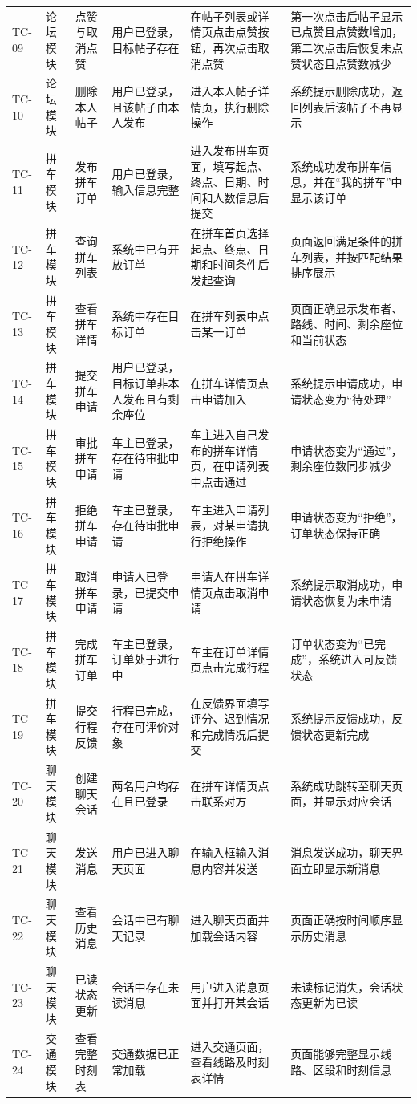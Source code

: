 \begin{longtable}{p{1.4cm}p{1.6cm}p{1.8cm}p{2.3cm}p{3.4cm}p{3.4cm}}
  TC-09 & 论坛模块 & 点赞与取消点赞 & 用户已登录，目标帖子存在 & 在帖子列表或详情页点击点赞按钮，再次点击取消点赞 & 第一次点击后帖子显示已点赞且点赞数增加，第二次点击后恢复未点赞状态且点赞数减少 \\
  TC-10 & 论坛模块 & 删除本人帖子 & 用户已登录，且该帖子由本人发布 & 进入本人帖子详情页，执行删除操作 & 系统提示删除成功，返回列表后该帖子不再显示 \\
  TC-11 & 拼车模块 & 发布拼车订单 & 用户已登录，输入信息完整 & 进入发布拼车页面，填写起点、终点、日期、时间和人数信息后提交 & 系统成功发布拼车信息，并在“我的拼车”中显示该订单 \\
  TC-12 & 拼车模块 & 查询拼车列表 & 系统中已有开放订单 & 在拼车首页选择起点、终点、日期和时间条件后发起查询 & 页面返回满足条件的拼车列表，并按匹配结果排序展示 \\
  TC-13 & 拼车模块 & 查看拼车详情 & 系统中存在目标订单 & 在拼车列表中点击某一订单 & 页面正确显示发布者、路线、时间、剩余座位和当前状态 \\
  TC-14 & 拼车模块 & 提交拼车申请 & 用户已登录，目标订单非本人发布且有剩余座位 & 在拼车详情页点击申请加入 & 系统提示申请成功，申请状态变为“待处理” \\
  TC-15 & 拼车模块 & 审批拼车申请 & 车主已登录，存在待审批申请 & 车主进入自己发布的拼车详情页，在申请列表中点击通过 & 申请状态变为“通过”，剩余座位数同步减少 \\
  TC-16 & 拼车模块 & 拒绝拼车申请 & 车主已登录，存在待审批申请 & 车主进入申请列表，对某申请执行拒绝操作 & 申请状态变为“拒绝”，订单状态保持正确 \\
  TC-17 & 拼车模块 & 取消拼车申请 & 申请人已登录，已提交申请 & 申请人在拼车详情页点击取消申请 & 系统提示取消成功，申请状态恢复为未申请 \\
  TC-18 & 拼车模块 & 完成拼车订单 & 车主已登录，订单处于进行中 & 车主在订单详情页点击完成行程 & 订单状态变为“已完成”，系统进入可反馈状态 \\
  TC-19 & 拼车模块 & 提交行程反馈 & 行程已完成，存在可评价对象 & 在反馈界面填写评分、迟到情况和完成情况后提交 & 系统提示反馈成功，反馈状态更新完成 \\
  TC-20 & 聊天模块 & 创建聊天会话 & 两名用户均存在且已登录 & 在拼车详情页点击联系对方 & 系统成功跳转至聊天页面，并显示对应会话 \\
  TC-21 & 聊天模块 & 发送消息 & 用户已进入聊天页面 & 在输入框输入消息内容并发送 & 消息发送成功，聊天界面立即显示新消息 \\
  TC-22 & 聊天模块 & 查看历史消息 & 会话中已有聊天记录 & 进入聊天页面并加载会话内容 & 页面正确按时间顺序显示历史消息 \\
  TC-23 & 聊天模块 & 已读状态更新 & 会话中存在未读消息 & 用户进入消息页面并打开某会话 & 未读标记消失，会话状态更新为已读 \\
  TC-24 & 交通模块 & 查看完整时刻表 & 交通数据已正常加载 & 进入交通页面，查看线路及时刻表详情 & 页面能够完整显示线路、区段和时刻信息 \\
\end{longtable}
\normalsize

